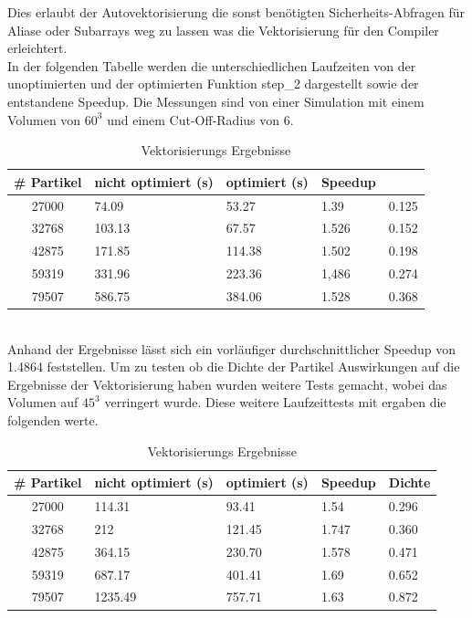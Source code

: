 \documentclass[
12pt,
a4paper,
BCOR10mm,
DIV14,
headsepline,
]{scrreprt}
\begin{document}
	Dies erlaubt der Autovektorisierung die sonst benötigten Sicherheits-Abfragen für Aliase oder Subarrays weg zu lassen was die Vektorisierung für den Compiler erleichtert.\\
	In der folgenden Tabelle werden die unterschiedlichen Laufzeiten von der unoptimierten und der optimierten Funktion step\_2 dargestellt sowie der entstandene Speedup. Die Messungen sind von einer Simulation mit einem Volumen von $60^3$ und einem Cut-Off-Radius von 6.
	\begin{table}[h]
		\centering
		\begin{tabular}{c|l|l|l|l}
			\# Partikel & nicht optimiert (s) & optimiert (s) & Speedup\\
			\hline
			27000 & 74.09 & 53.27 & 1.39 & 0.125\\
			\hline
			32768 &  103.13 & 67.57 & 1.526 & 0.152\\
			\hline
			42875 & 171.85 & 114.38 & 1.502 & 0.198\\
			\hline
			59319 & 331.96& 223.36  & 1,486& 0.274\\
			\hline
			79507 &586.75 & 384.06 & 1.528 & 0.368\\
		\end{tabular}
		\caption{Vektorisierungs Ergebnisse}
		\label{table:VecErg1}
	\end{table}\\
	Anhand der Ergebnisse lässt sich ein vorläufiger durchschnittlicher Speedup von 1.4864 feststellen.	Um zu testen ob die Dichte der Partikel Auswirkungen auf die Ergebnisse der Vektorisierung haben wurden weitere Tests gemacht, wobei das Volumen auf $45^3$ verringert wurde. Diese weitere Laufzeittests mit ergaben die folgenden werte.
	\begin{table}[h]
		\centering
		\begin{tabular}{c|l|l|l|l}
			\# Partikel & nicht optimiert (s) & optimiert (s) & Speedup & Dichte\\
			\hline
			27000 & 114.31 & 93.41 & 1.54 & 0.296\\
			\hline
			32768 &  212 & 121.45 & 1.747 & 0.360\\
			\hline
			42875 & 364.15 & 230.70 & 1.578 & 0.471\\
			\hline
			59319 & 687.17 & 401.41 & 1.69 & 0.652\\
			\hline
			79507 &1235.49 & 757.71 & 1.63 & 0.872\\
		\end{tabular}
		\caption{Vektorisierungs Ergebnisse}
		\label{table:VecErg1}
	\end{table}\\
\end{document}

